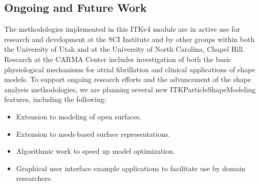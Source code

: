 \documentclass[11pt]{article}
\begin{document}
\subsection{Ongoing and Future Work}
The methodologies implemented in this ITKv4 module are in active use
for research and development at the SCI Institute and by other groups
within both the University of Utah and at the University of North
Carolina, Chapel Hill.  Research at the CARMA Center includes
investigation of both the basic physiological mechanisms for atrial
fibrillation and clinical applications of shape models.  To support
ongoing research efforts and the advancement of the shape analysis
methodologies, we are planning several new ITKParticleShapeModeling
features, including the following:
\begin{itemize}
\item Extension to modeling of open surfaces.
\item Extension to mesh-based surface representations.
\item Algorithmic work to speed up model optimization.
\item Graphical user interface example applications to facilitate use
  by domain researchers.
\end{itemize}
\end{document}
